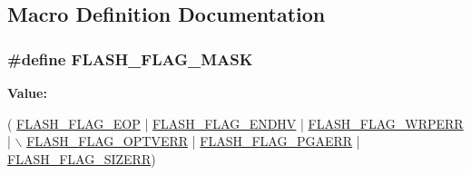 \subsection{Macro Definition Documentation}
\hypertarget{group___f_l_a_s_h_ex___private___defines_gab875fa2d3d66a73fc5c7ee350920b1b5}{
\subsubsection[{F\-L\-A\-S\-H\-\_\-\-F\-L\-A\-G\-\_\-\-M\-A\-S\-K}]{\setlength{\rightskip}{0pt plus 5cm}\#define F\-L\-A\-S\-H\-\_\-\-F\-L\-A\-G\-\_\-\-M\-A\-S\-K}}\label{group___f_l_a_s_h_ex___private___defines_gab875fa2d3d66a73fc5c7ee350920b1b5}
{\bfseries Value\-:}
\begin{DoxyCode}
( \hyperlink{group___f_l_a_s_h___flags_gaf043ba4d8f837350bfc7754a99fae5a9}{FLASH\_FLAG\_EOP}        | \hyperlink{group___f_l_a_s_h___flags_ga9979b826ad18f10a565f5c0bbab2cd98}{FLASH\_FLAG\_ENDHV}  | 
      \hyperlink{group___f_l_a_s_h___flags_ga6abf64f916992585899369166db3f266}{FLASH\_FLAG\_WRPERR} | \hyperlink{group___f_l_a_s_h___flags_gacb2c4c991a260c3f110cd8c72f302864}{\(\backslash\)}
\hyperlink{group___f_l_a_s_h___flags_gacb2c4c991a260c3f110cd8c72f302864}{                                  FLASH\_FLAG\_OPTVERR}   
       | \hyperlink{group___f_l_a_s_h___flags_ga2c3f4dbea065f8ea2987eada4dab30bd}{FLASH\_FLAG\_PGAERR} | \hyperlink{group___f_l_a_s_h___flags_gac20909664e371d2ca0436a055393f9c4}{FLASH\_FLAG\_SIZERR})
\end{DoxyCode}
